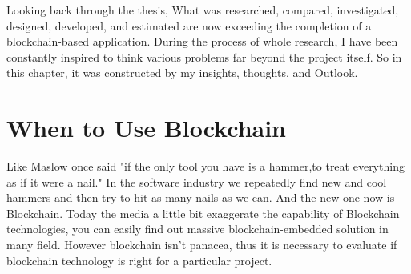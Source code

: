 Looking back through the thesis, What was researched, compared, investigated, designed, developed, and estimated are now exceeding the completion of a blockchain-based application. During the process of whole research, I have been constantly inspired to think various problems far beyond the project itself. So in this chapter, it was constructed by my insights, thoughts, and Outlook.

\section{When to Use Blockchain}
Like Maslow once said "if the only tool you have is a hammer,to treat everything as if it were a nail." In the software industry we repeatedly find new and cool hammers and then try to hit as many nails as we can. And the new one now is Blockchain. Today the media a little bit exaggerate the capability of Blockchain technologies, you can easily find out massive blockchain-embedded solution in many field. However blockchain isn't panacea, thus it is necessary to evaluate if blockchain technology is right for a particular project.

